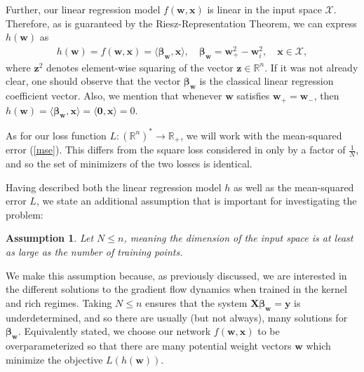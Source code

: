 \documentclass{article}
\newtheorem*{assumption}{Assumption}
\begin{document}
Further, our linear regression model $f(\boldsymbol{w}, \boldsymbol{x})$ is linear in the input space $\mathcal{X}$. Therefore, as is guaranteed by the Riesz-Representation Theorem, we can express $h(\boldsymbol{w})$ as 
\begin{align}
    h(\boldsymbol{w}) = f(\boldsymbol{w}, \boldsymbol{x}) = \langle \boldsymbol{\beta}_{\boldsymbol{w}}, \boldsymbol{x} \rangle, \quad \boldsymbol{\beta}_{\boldsymbol{w}} = \boldsymbol{w}_{+}^2 - \boldsymbol{w}_{i}^2, \quad \boldsymbol{x} \in \mathcal{X},
\end{align}
where $\boldsymbol{z}^2$ denotes element-wise squaring of the vector $\boldsymbol{z} \in \mathbb{R}^n$. If it was not already clear, one should observe that the vector $\boldsymbol{\beta}_{\boldsymbol{w}}$ is the classical linear regression coefficient vector. Also, we mention that whenever $\boldsymbol{w}$ satisfies $\boldsymbol{w}_+ = \boldsymbol{w}_-$, then $h(\boldsymbol{w}) = \langle \boldsymbol{\beta}_{\boldsymbol{w}}, \boldsymbol{x} \rangle = \langle \boldsymbol{0}, \boldsymbol{x} \rangle = 0$.

As for our loss function $L: (\mathbb{R}^n)^* \rightarrow \mathbb{R}_+$, we will work with the mean-squared error (\ref{mse}). This differs from the square loss considered in \cite{woodworth2020kernel} only by a factor of $\frac{1}{N}$, and so the set of minimizers of the two losses is identical.

Having described both the linear regression model $h$ as well as the mean-squared error $L$, we state an additional assumption that is important for investigating the problem:
\begin{assumption}
Let $N \leq n$, meaning the dimension of the input space is at least as large as the number of training points.
\end{assumption}
We make this assumption because, as previously discussed, we are interested in the different solutions to the gradient flow dynamics when trained in the kernel and rich regimes. Taking $N \leq n$ ensures that the system $\boldsymbol{X}\boldsymbol{\beta}_{\boldsymbol{w}} = \boldsymbol{y}$ is underdetermined, and so there are usually (but not always), many solutions for $\boldsymbol{\beta}_{\boldsymbol{w}}$. Equivalently stated, we choose our network $f(\boldsymbol{w}, \boldsymbol{x})$ to be overparameterized so that there are many potential weight vectors $\boldsymbol{w}$ which minimize the objective $L(h(\boldsymbol{w}))$.
\end{document}
